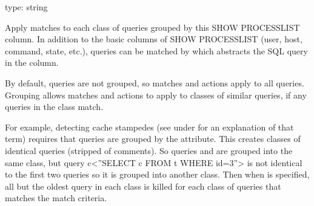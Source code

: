 \documentclass[letterpaper,10pt,english]{sphinxmanual}
\begin{document}
\begin{fulllineitems}
\label{\detokenize{mariadb-kill:cmdoption-mariadb-kill-group-by}}
type: string

Apply matches to each class of queries grouped by this SHOW PROCESSLIST column.
In addition to the basic columns of SHOW PROCESSLIST (user, host, command,
state, etc.), queries can be matched by  which abstracts the
SQL query in the  column.

By default, queries are not grouped, so matches and actions apply to all
queries.  Grouping allows matches and actions to apply to classes of
similar queries, if any queries in the class match.

For example, detecting cache stampedes (see  under
{\hyperref[\detokenize{mariadb-kill:cmdoption-mariadb-kill-victims}]{}} for an explanation of that term) requires that queries are
grouped by the  attribute.  This creates classes of identical queries
(stripped of comments).  So queries  and
 are grouped into the same class, but
query c\textless{}”SELECT c FROM t WHERE id=3”\textgreater{} is not identical to the first two
queries so it is grouped into another class. Then when {\hyperref[\detokenize{mariadb-kill:cmdoption-mariadb-kill-victims}]{}}
 is specified, all but the oldest query in each class is
killed for each class of queries that matches the match criteria.

\end{fulllineitems}

\end{document}
